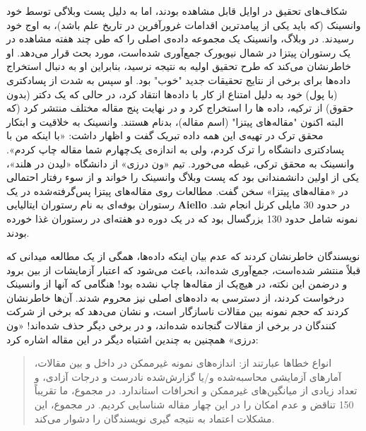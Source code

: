 شکاف‌های تحقیق در اوایل قابل مشاهده بودند، اما به دلیل پست وبلاگی توسط خود وانسینک (که باید یکی از پیامدترین اقدامات غرورآفرین در تاریخ علم باشد)، به اوج خود رسیدند.
در وبلاگ، وانسینک یک مجموعه داده‌ی اصلی را که طی چند هفته مشاهده در یک رستوران پیتزا در شمال نیویورک جمع‌آوری شده‌است، مورد بحث قرار می‌دهد.
او خاطرنشان می‌کند که طرح تحقیق اولیه به نتیجه نرسید، بنابراین او به دنبال استخراج داده‌ها برای برخی از نتایج تحقیقات جدید "خوب" بود.
او سپس به شدت از پسادکتری (با پول) خود به دلیل امتناع از کار با داده‌ها انتقاد کرد، در حالی که یک دکتر (بدون حقوق) از ترکیه، داده ها را استخراج کرد و در نهایت پنج مقاله مختلف منتشر کرد (که البته اکنون "مقاله‌های پیتزا" (اسم مقاله)، بدنام هستند.
وانسینک به خلاقیت و ابتکار محقق ترک در تهیه‌ی این همه داده تبریک گفت و اظهار داشت: «با اینکه من با پسادکتری دانشگاه را ترک کردم، ولی به اندازه‌ی یک‌چهارم شما مقاله چاپ کردم».
وانسینک به محقق ترکی، غبطه می‌خورد.
تیم «ون درزی» از دانشگاه «لیدن در هلند»، یکی از اولین دانشمندانی بود که پست وبلاگ وانسینک را خواند و از سوء رفتار احتمالی در «مقاله‌های پیتزا» سخن گفت.
مطالعات روی مقاله‌های پیتزا پس‌گرفته‌شده در یک رستوران بوفه‌ای به نام رستوران ایتالیایی \textenglish{\textbf{Aiello}} در حدود 30 مایلی کرنل انجام شد.
نمونه شامل حدود 130 بزرگسال بود که در یک دوره دو هفته‌ای در رستوران غذا خورده بودند.

نویسندگان خاطرنشان کردند که عدم بیان اینکه داده‌ها، همگی از یک مطالعه میدانی که قبلاً منتشر شده‌است، جمع‌آوری شده‌اند، باعث می‌شود که اعتبار آزمایشات از بین برود و درضمن این نکته، در هیچ‌یک از مقاله‌ها چاپ نشده بود!
هنگامی که آنها از وانسینک درخواست کردند، از دسترسی به داده‌های اصلی نیز محروم شدند.
آن‌ها خاطرنشان کردند که حجم نمونه بین مقالات ناسازگار است، و نشان می‌دهد که برخی از شرکت کنندگان در برخی از مقالات گنجانده شده‌اند، و در برخی دیگر حذف شده‌اند!
«ون درزی» همچنین به چندین اشتباه دیگر در این مقاله اشاره کرد:

\begin{quote}
    انواع خطاها عبارتند از: اندازه‌های نمونه غیرممکن در داخل و بین مقالات، آمارهای آزمایشی محاسبه‌شده و/یا گزارش‌شده نادرست و درجات آزادی، و تعداد زیادی از میانگین‌های غیرممکن و انحرافات استاندارد.
    در مجموع، ما تقریباً 150 تناقض و عدم امکان را در این چهار مقاله شناسایی کردیم.
    در مجموع، این مشکلات اعتماد به نتیجه گیری نویسندگان را دشوار می‌کند.
\end{quote}

